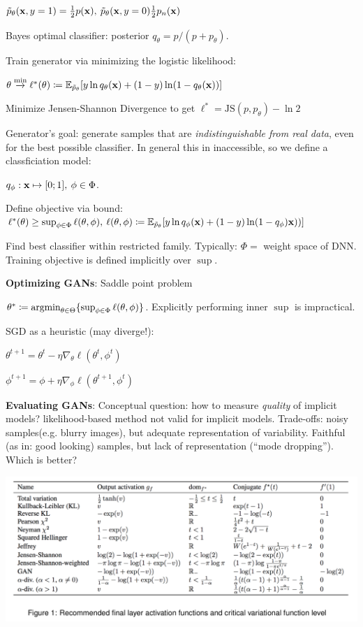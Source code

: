\tab $\Tilde{p}_\theta (\mathbf x,y=1)=\frac{1}{2}p(\mathbf x),\> \Tilde{p}_\theta(\mathbf x,y=0)\frac{1}{2}p_n(\mathbf x)$

Bayes optimal classifier: posterior $q_\theta=p/(p+p_\theta)$.

Train generator via minimizing the logistic likelihood:

\tab $\theta \overset{\min}{\xrightarrow{}}\ell^*(\theta)\coloneqq\mathbb E_{\Tilde{p}_\theta} \lbrack y \ln q_\theta(\mathbf x) + (1-y)\ln(1-q_\theta(\mathbf x))\rbrack$

Minimize Jensen-Shannon Divergence to get $\ell^*=\text{JS}(p,p_\theta)-\ln 2$

Generator's goal: generate samples that are \emph{indistinguishable from real data}, even for the best possible classifier. In general this in inaccessible, so we define a classficiation model:

\tab $q_\phi:\mathbf x\mapsto\lbrack 0;1 \rbrack,\> \phi\in\Phi$.

Define objective via bound: \\
\tab$\ell^*(\theta)\geq \sup_{\phi\in\Phi}\ell(\theta,\phi),\> \ell(\theta,\phi)\coloneqq\mathbb E_{\Tilde{p}_\theta} \lbrack y\ln q_\phi(\mathbf x) + (1-y)\ln(1-q_\phi)\mathbf x))\rbrack$

Find best classifier within restricted family. Typically: $\Phi=$ weight space of DNN. Training objective is defined implicitly over $\sup$.

\textbf{Optimizing GANs}: Saddle point problem

\tab $\theta^*\coloneqq \mathop{\mathrm{argmin}}_{\theta\in\Theta} \{\sup_{\phi\in\Phi} \ell(\theta,\phi)\}$. Explicitly performing inner $\sup$ is impractical. 

SGD as a heuristic (may diverge!):

\tab $\theta^{t+1}=\theta^t-\eta\nabla_\theta\ell(\theta^t,\phi^t)$

\tab $\phi^{t+1}=\phi+\eta\nabla_\phi\ell(\theta^{t+1},\phi^t)$

\textbf{Evaluating GANs}: Conceptual question: how to measure \emph{quality} of implicit models? likelihood-based method not valid for implicit models. Trade-offs: noisy samples(e.g. blurry images), but adequate representation of variability. Faithful (as in: good looking) samples, but lack of representation (``mode dropping''). Which is better?


\includegraphics[scale=.25]{images/f-divergences.png}